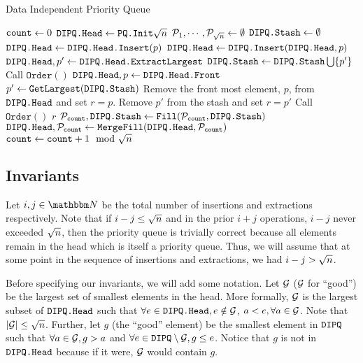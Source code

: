 	
\begin{algorithm}
	\caption{Data Independent Priority Queue}
	\label{alg:DIQueue}
	\begin{algorithmic}[1]
		\Function{$\DIPQInit$}{}
		\State ${\texttt{count}} \gets 0$
		\State $\texttt{DIPQ.Head} \gets \texttt{PQ.Init}{\sqrt{n}}$
		\State $\mathcal{P}_1, \cdots, \mathcal{P}_{\sqrt{n}} \gets \emptyset$
		\State $\texttt{DIPQ.Stash} \gets \emptyset$
		\EndFunction
		\If{$|\DIPQhead| < \sqrtn$}
		\State $\texttt{DIPQ.Head} \gets \texttt{DIPQ.Head}\texttt{.Insert}(p)$
		\Else
		\State $\texttt{DIPQ.Head} \gets \texttt{DIPQ.Insert}(\texttt{DIPQ.Head}, p)$
		\State $\texttt{DIPQ.Head}, p' \gets \texttt{DIPQ.Head}\texttt{.ExtractLargest}$ \label{algline:PQExtractIns}
		\State $\texttt{DIPQ.Stash} \gets \texttt{DIPQ.Stash} \bigcup \{p'\}$
		\EndIf
		\State Call $\texttt{Order}()$ \label{algline:PQOrderIns}
		\EndFunction
		\Function{$\DIPQExtract$}{}
		\State $\texttt{DIPQ.Head}, p \gets \texttt{DIPQ.Head}\texttt{.Front}$
		\State $p' \gets \texttt{GetLargest}(\texttt{DIPQ.Stash})$
		 Remove the front most element, $p$, from $\texttt{DIPQ.Head}$ and set $r = p$.
		\Else \; Remove $p'$ from the stash and set $ r = p'$
		\EndIf
		\State Call $\texttt{Order}()$
		\State \Return $r$
		\EndFunction
		\Function{$\DIPQOrder$}{}
		\State $\mathcal{P}_{{\texttt{count}}}, \texttt{DIPQ.Stash} \gets \texttt{Fill}(\mathcal{P}_{\texttt{count}}, \texttt{DIPQ.Stash})$
		\State $\texttt{DIPQ.Head}, \mathcal{P}_{\texttt{count}} \gets \texttt{MergeFill}(\texttt{DIPQ.Head}, \mathcal{P}_{\texttt{count}})$
		\State ${\texttt{count}} \gets {\texttt{count}} + 1 \mod {{\sqrt{n}}}$
		\EndFunction
	\end{algorithmic}
\end{algorithm}


\subsection{Invariants}
\label{subsec:invariants}
Let $i, j \in \N$ be the total number of insertions and extractions respectively. Note that if $i - j \leq {\sqrt{n}}$
and in the prior $i + j$ operations, $i - j$ never exceeded ${\sqrt{n}}$, then the priority queue is trivially correct because all elements remain in the head which is itself a priority queue.
Thus, we will assume that at some point in the sequence of insertions and extractions, we had $i - j > {\sqrt{n}}$.

Before specifying our invariants, we will add some notation. Let $\mathcal{G}$ ($\mathcal{G}$ for ``good'') be the largest set of smallest elements in the head. More formally,
$\mathcal{G}$ is the largest subset of $\texttt{DIPQ.Head}$ such that $\forall e \in \texttt{DIPQ.Head}, e \notin \mathcal{G}$, $a < e, \forall a \in \mathcal{G}$. Note that $|\mathcal{G}| \leq {\sqrt{n}}$.
Further, let $g$ (the ``good'' element) be the smallest element in $\texttt{DIPQ}$ such that $\forall a \in \mathcal{G}, g > a$ and $\forall e \in \texttt{DIPQ} \setminus \mathcal{G}, g \leq e$.
Notice that $g$ is not in $\texttt{DIPQ.Head}$ because if it were, $\mathcal{G}$ would contain $g$.


